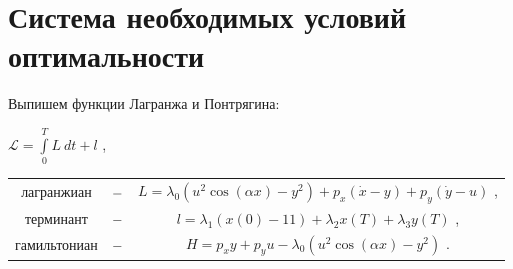 \documentclass[a4paper,12pt,oneside]{article}
\numberwithin{equation}{section}
\numberwithin{table}{section}
\numberwithin{figure}{section}
\begin{document}
\section{Система необходимых условий оптимальности}
Выпишем функции Лагранжа и Понтрягина:
\begin{center}

    $\mathcal{L} = \int\limits_0^T L~dt +l$ ,\\
    \begin{tabular}{c c c}
        лагранжиан &$\--$& $L = \lambda_0 (u^2 \cos (\alpha x) - y^2) + p_x(\dot{x}-y) + p_y(\dot{y}-u)$ ,\\
        терминант &$\--$& $l = \lambda_1 (x(0) - 11) + \lambda_2 x(T) + \lambda_3 y(T)$ ,\\
        гамильтониан &$\--$& $H = p_x y + p_y u - \lambda_0 (u^2 \cos (\alpha x) - y^2)$ .\\
    \end{tabular}
\end{center}
\end{document}
